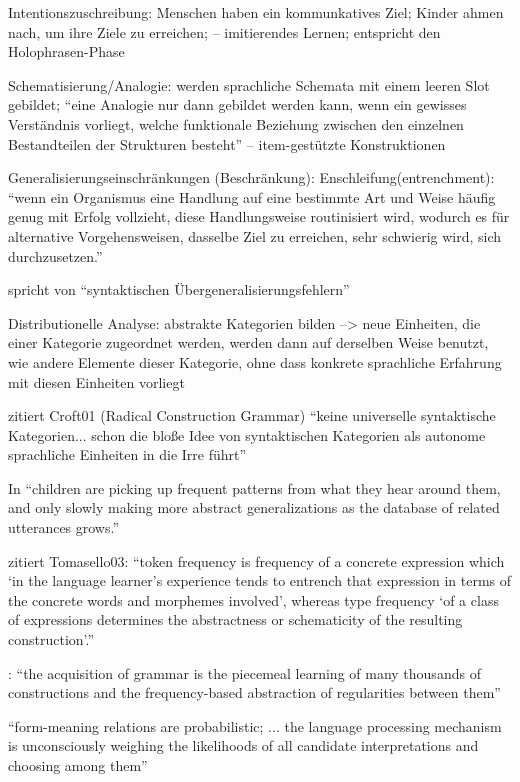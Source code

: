         Intentionszuschreibung: Menschen haben ein kommunkatives Ziel; Kinder ahmen nach, um ihre Ziele zu erreichen; -- imitierendes Lernen; entspricht den Holophrasen-Phase

        Schematisierung/Analogie: werden sprachliche Schemata mit einem leeren Slot gebildet;
        ``eine Analogie nur dann gebildet werden kann, wenn ein gewisses Verständnis vorliegt, welche funktionale Beziehung zwischen den einzelnen Bestandteilen der Strukturen besteht''
        -- item-gestützte Konstruktionen

        Generalisierungseinschränkungen (Beschränkung):
        Enschleifung(entrenchment): ``wenn ein Organismus eine Handlung auf eine bestimmte Art und Weise häufig genug mit Erfolg vollzieht, diese Handlungsweise routinisiert wird, wodurch es für alternative Vorgehensweisen, dasselbe Ziel zu erreichen, sehr schwierig wird, sich durchzusetzen.''

        spricht von ``syntaktischen Übergeneralisierungsfehlern''

        Distributionelle Analyse: abstrakte Kategorien bilden --> neue Einheiten, die einer Kategorie zugeordnet werden, werden dann auf derselben Weise benutzt, wie andere Elemente dieser Kategorie, ohne dass konkrete sprachliche Erfahrung mit diesen Einheiten vorliegt

        \cite{Tomasello06} zitiert Croft01 (Radical Construction Grammar) ``keine universelle syntaktische Kategorien... schon die bloße Idee von syntaktischen Kategorien als autonome sprachliche Einheiten in die Irre führt''

        In \cite{Ellis08} ``children are picking up frequent patterns from what they hear around them, and only slowly making more abstract generalizations as the database of related utterances grows.''

        \cite{Eskildsen08} zitiert Tomasello03: ``token frequency is frequency of a concrete
        expression which ‘in the language learner’s experience tends to entrench
        that expression in terms of the concrete words and morphemes involved’,
        whereas type frequency ‘of a class of expressions determines the abstractness
        or schematicity of the resulting construction’.''

        \cite{Ellis04}: ``the acquisition of grammar is the piecemeal learning of many thousands of constructions and the frequency-based abstraction of regularities between them''

        ``form-meaning relations are probabilistic; ... the language processing mechanism is unconsciously weighing the likelihoods of all candidate interpretations and choosing among them''

